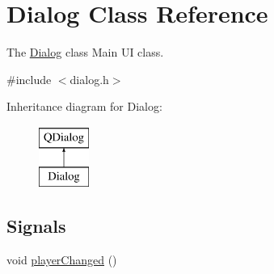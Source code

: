 \hypertarget{class_dialog}{\section{Dialog Class Reference}
\label{class_dialog}
}


The \hyperlink{class_dialog}{Dialog} class Main U\-I class.  




{\ttfamily \#include $<$dialog.\-h$>$}

Inheritance diagram for Dialog\-:\begin{figure}[H]
\begin{center}
\leavevmode
\includegraphics[height=2.000000cm]{class_dialog}
\end{center}
\end{figure}
\subsection*{Signals}
\begin{DoxyCompactItemize}
\item 
void \hyperlink{class_dialog_a5f21e292b0ba87e64682cc7b7a53c7cc}{player\-Changed} ()
\end{DoxyCompactItemize}
